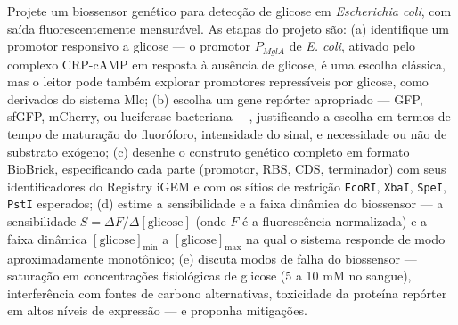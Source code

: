 \begin{exercicio}
Projete um biossensor genético para detecção de glicose em \textit{Escherichia coli}, com saída fluorescentemente mensurável. As etapas do projeto são: (a) identifique um promotor responsivo a glicose --- o promotor $P_{MglA}$ de \textit{E. coli}, ativado pelo complexo CRP-cAMP em resposta à ausência de glicose, é uma escolha clássica, mas o leitor pode também explorar promotores repressíveis por glicose, como derivados do sistema Mlc; (b) escolha um gene repórter apropriado --- GFP, sfGFP, mCherry, ou luciferase bacteriana ---, justificando a escolha em termos de tempo de maturação do fluoróforo, intensidade do sinal, e necessidade ou não de substrato exógeno; (c) desenhe o construto genético completo em formato BioBrick, especificando cada parte (promotor, RBS, CDS, terminador) com seus identificadores do Registry iGEM e com os sítios de restrição \texttt{EcoRI}, \texttt{XbaI}, \texttt{SpeI}, \texttt{PstI} esperados; (d) estime a sensibilidade e a faixa dinâmica do biossensor --- a sensibilidade $S = \Delta F / \Delta [\text{glicose}]$ (onde $F$ é a fluorescência normalizada) e a faixa dinâmica $[\text{glicose}]_{\min}$ a $[\text{glicose}]_{\max}$ na qual o sistema responde de modo aproximadamente monotônico; (e) discuta modos de falha do biossensor --- saturação em concentrações fisiológicas de glicose (5 a 10 mM no sangue), interferência com fontes de carbono alternativas, toxicidade da proteína repórter em altos níveis de expressão --- e proponha mitigações.
\end{exercicio}


